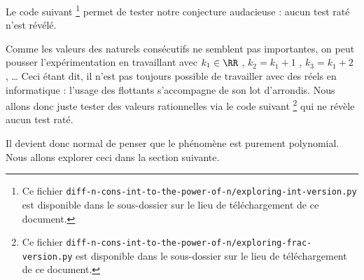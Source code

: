 Le code suivant
\footnote{
	Ce fichier \texttt{diff-n-cons-int-to-the-power-of-n/exploring-int-version.py} est disponible dans le sous-dossier sur le lieu de téléchargement de ce document.
}
permet de tester notre conjecture audacieuse : aucun test raté n'est révélé.

\medskip





Comme les valeurs des naturels consécutifs ne semblent pas importantes, on peut pousser l'expérimentation en travaillant avec $k_1 \in \RR$ , $k_2 = k_1 + 1$ , $k_3 = k_1 + 2$ , \dots
Ceci étant dit, il n'est pas toujours possible de travailler avec des réels en informatique : l'usage des flottants s'accompagne de son lot d'arrondis.
Nous allons donc juste tester des valeurs rationnelles via le code suivant
\footnote{
	Ce fichier \texttt{diff-n-cons-int-to-the-power-of-n/exploring-frac-version.py} est disponible dans le sous-dossier sur le lieu de téléchargement de ce document.
}
qui ne révèle aucun test raté.

\medskip



Il devient donc normal de penser que le phénomène est purement polynomial. Nous allons explorer ceci dans la section suivante.
